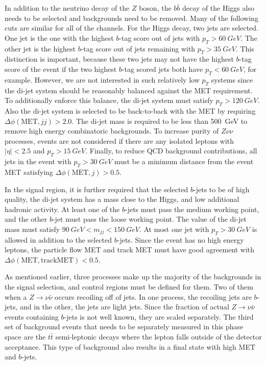 In addition to the neutrino decay of the $Z$ boson, the $b\bar{b}$ decay
of the Higgs also needs to be selected and backgrounds need to be removed.
Many of the following cuts are similar for all of the channels.
For the Higgs decay, two jets are selected.
One jet is the one with the highest $b$-tag score out of jets with $p_T > \SI{60}{GeV}$.
The other jet is the highest $b$-tag score out of jets remaining with $p_T > \SI{35}{GeV}$.
This distinction is important, because these two jets may not have the highest
$b$-tag score of the event if the two highest $b$-tag scored jets both have
$p_T < \SI{60}{GeV}$, for example.
However, we are not interested in such relatively low $p_T$ systems since
the di-jet system should be reasonably balanced against the MET requirement.
To additionally enforce this balance, the di-jet system must satisfy $p_T > \SI{120}{GeV}$.
Also the di-jet system is selected to be back-to-back with the MET
by requiring $\Delta\phi(\mathrm{MET}, jj) > 2.0$.
The di-jet mass is required to be less than \SI{500}{GeV} to remove high energy
combinatoric backgrounds.
To increase purity of $Z\nu\nu$ processes,
events are not considered if there are any isolated leptons
with $|\eta| < 2.5$ and $p_T > \SI{15}{GeV}$.
Finally, to reduce QCD background contributions,
all jets in the event with $p_T > \SI{30}{GeV}$
must be a minimum distance from the event MET satisfying
$\Delta \phi(\mathrm{MET}, j) > 0.5$.

In the signal region, it is further required that
the selected $b$-jets to be of high quality,
the di-jet system has a mass close to the Higgs,
and low additional hadronic activity.
At least one of the $b$-jets must pass the medium working point,
and the other $b$-jet must pass the loose working point.
The value of the di-jet mass must satisfy $\SI{90}{GeV} < m_{jj} < \SI{150}{GeV}$.
At most one jet with $p_T > \SI{30}{GeV}$ is allowed
in addition to the selected $b$-jets.
Since the event has no high energy leptons,
the particle flow MET and track MET must have good agreement with
$\Delta \phi(\mathrm{MET}, \mathrm{track MET}) < 0.5$.

As mentioned earlier, three processes make up the majority of the backgrounds
in the signal selection, and control regions must be defined for them.
Two of them when a $Z \rightarrow \nu\bar{\nu}$ occurs recoiling off of jets.
In one process, the recoiling jets are $b$-jets, and in the other, the jets are light jets.
Since the fraction of actual $Z \rightarrow \nu\bar{\nu}$ events
containing $b$-jets is not well known, they are scaled separately.
The third set of background events that needs to be separately measured in this phase space
are the $t\bar{t}$ semi-leptonic decays
where the lepton falls outside of the detector acceptance.
This type of background also results in a final state with high MET and $b$-jets.

